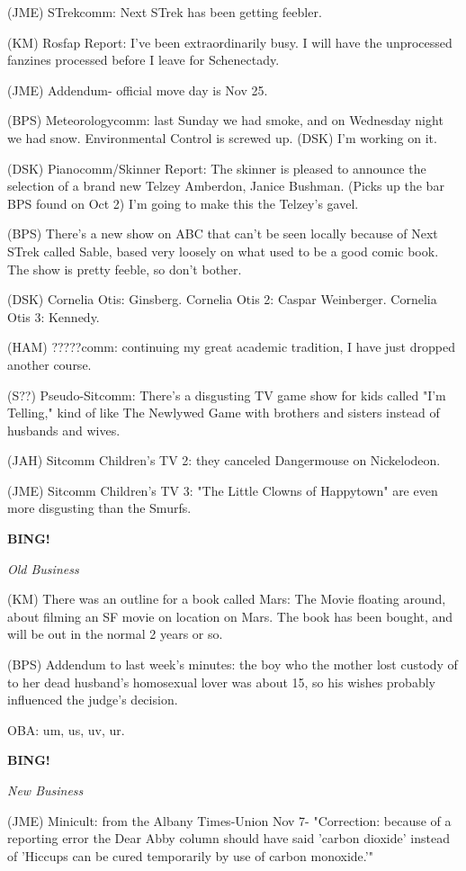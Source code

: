 \documentclass[12pt]{article}
\newcommand{\bing}{{\bf BING!} }
\newcommand{\goto}[1]{\bing \vskip 12pt \centerline{{\em{#1}}}}
\begin{document}
(JME) STrekcomm: Next STrek has been getting feebler.

(KM) Rosfap Report: I've been extraordinarily busy. I will have the unprocessed fanzines processed before I leave for Schenectady.

(JME) Addendum- official move day is Nov 25.

(BPS) Meteorologycomm: last Sunday we had smoke, and on Wednesday night we had snow. Environmental Control is screwed up. (DSK) I'm working on it.

(DSK) Pianocomm/Skinner Report: The skinner is pleased to announce the selection of a brand new Telzey Amberdon, Janice Bushman. (Picks up the bar BPS found on Oct 2) I'm going to make this the Telzey's gavel.

(BPS) There's a new show on ABC that can't be seen locally because of Next STrek called Sable, based very loosely on what used to be a good comic book. The show is pretty feeble, so don't bother.

(DSK) Cornelia Otis: Ginsberg. Cornelia Otis 2: Caspar Weinberger. Cornelia Otis 3: Kennedy.

(HAM) ?????comm: continuing my great academic tradition, I have just dropped another course.

(S??) Pseudo-Sitcomm: There's a disgusting TV game show for kids called "I'm Telling," kind of like The Newlywed Game with brothers and sisters instead of husbands and wives.

(JAH) Sitcomm Children's TV 2: they canceled Dangermouse on Nickelodeon.

(JME) Sitcomm Children's TV 3: "The Little Clowns of Happytown" are even more disgusting than the Smurfs.

\goto{Old Business}

(KM) There was an outline for a book called Mars: The Movie floating around, about filming an SF movie on location on Mars. The book has been bought, and will be out in the normal 2 years or so.

(BPS) Addendum to last week's minutes: the boy who the mother lost custody of to her dead husband's homosexual lover was about 15, so his wishes probably influenced the judge's decision.

OBA: um, us, uv, ur.

\goto{New Business}

(JME) Minicult: from the Albany Times-Union Nov 7- "Correction: because of a reporting error the Dear Abby column should have said 'carbon dioxide' instead of 'Hiccups can be cured temporarily by use of carbon monoxide.'"
\end{document}

